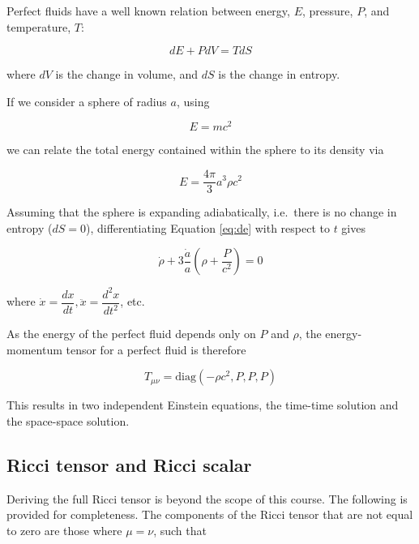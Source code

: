 \documentclass[]{book}
\begin{document}
Perfect fluids have a well known relation between energy, \(E\),
pressure, \(P\), and temperature, \(T\):

\begin{equation}
dE + PdV = TdS
\label{eq:de}
\end{equation}

where \(dV\) is the change in volume, and \(dS\) is the change in
entropy.

If we consider a sphere of radius \(a\), using

\begin{equation}
E = mc^2
\label{eq:emc2}
\end{equation}

we can relate the total energy contained within the sphere to its
density via

\begin{equation}
E = \dfrac{4\pi}{3}a^3\rho c^2
\label{eq:e-rho}
\end{equation}

Assuming that the sphere is expanding adiabatically, i.e.~there is no
change in entropy (\(dS = 0\)), differentiating Equation \eqref{eq:de}
with respect to \(t\) gives

\begin{equation}
    \dot{\rho} + 3\dfrac{\dot{a}}{a}\left(\rho + \dfrac{P}{c^2}\right) = 0
\label{eq:fluid}
\end{equation}

where \(\dot{x} = \dfrac{dx}{dt}, \ddot{x} = \dfrac{d^2x}{dt^2}\), etc.

As the energy of the perfect fluid depends only on \(P\) and \(\rho\),
the energy-momentum tensor for a perfect fluid is therefore

\begin{equation}
T_{\mu\nu} = \text{diag}\left(-\rho c^2, P, P, P\right)
\label{eq:per-fluid}
\end{equation}

This results in two independent Einstein equations, the time-time
solution and the space-space solution.

\subsection{Ricci tensor and Ricci scalar}\label{sec:ricci}

Deriving the full Ricci tensor is beyond the scope of this course. The
following is provided for completeness. The components of the Ricci
tensor that are not equal to zero are those where \(\mu = \nu\), such
that
\end{document}

